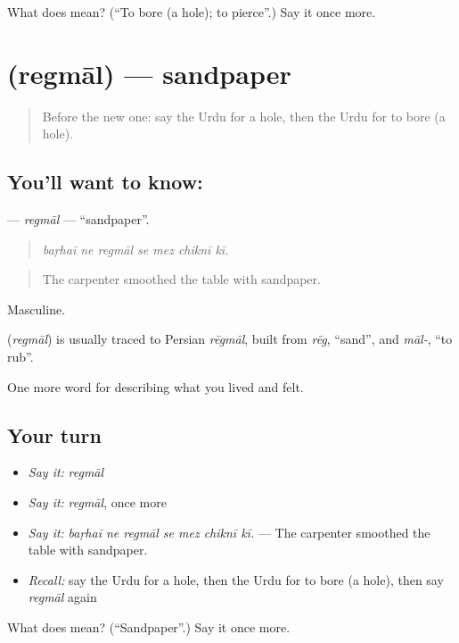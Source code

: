 \begin{tcolorbox}[breakable,colback=teal!4,colframe=teal!35!black,title={Before you move on}]
What does  mean? (\textquotedblleft{}To bore (a hole); to pierce\textquotedblright{}.) Say it once more.
\end{tcolorbox}
\section[\texorpdfstring{\ur{ریگمال} (regmāl)}{ریگمال (regmāl)}]{ (regmāl) — sandpaper}

\label{lesson:UR-C496-regmal}



\begin{quote}
Before the new one: say the Urdu for a hole, then the Urdu for to bore (a hole).
\end{quote}

\subsection*{You'll want to know: }
\textbf{} — \emph{regmāl} — \textquotedblleft{}sandpaper\textquotedblright{}.

\begin{quote}
      
\end{quote}

\begin{quote}
\emph{baṛhaī ne regmāl se mez chiknī kī.}
\end{quote}

\begin{quote}
The carpenter smoothed the table with sandpaper.
\end{quote}

Masculine.

\begin{cousinweb}
\textbf{} (\emph{regmāl}) is usually traced to Persian \emph{rēgmāl}, built from \emph{rēg}, \textquotedblleft{}sand\textquotedblright{}, and \emph{māl-}, \textquotedblleft{}to rub\textquotedblright{}.
\end{cousinweb}

\begin{grammarlens}[title={What you've built}]
One more word for describing what you lived and felt.
\end{grammarlens}

\subsection*{Your turn}
\begin{itemize}
\raggedright
  \item \emph{Say it:} \emph{regmāl}
  \item \emph{Say it:} \emph{regmāl}, once more
  \item \emph{Say it:} \emph{baṛhaī ne regmāl se mez chiknī kī.} — The carpenter smoothed the table with sandpaper.
  \item \emph{Recall:} say the Urdu for a hole, then the Urdu for to bore (a hole), then say \emph{regmāl} again
\end{itemize}

\begin{tcolorbox}[breakable,colback=teal!4,colframe=teal!35!black,title={Before you move on}]
What does  mean? (\textquotedblleft{}Sandpaper\textquotedblright{}.) Say it once more.
\end{tcolorbox}
